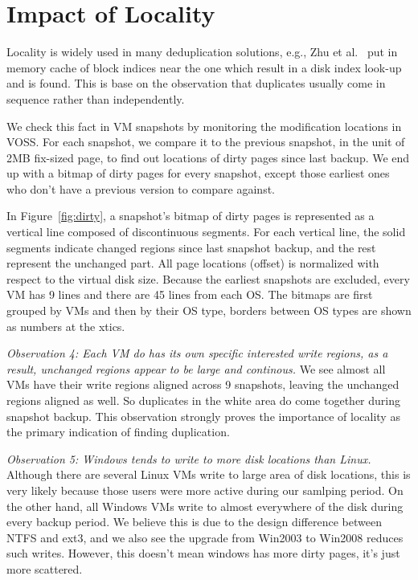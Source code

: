 \section{Impact of Locality}
\label{sect:loc}
Locality is widely used in many deduplication solutions, e.g., Zhu et al.~\cite{bottleneck08}
put in memory cache of block indices near the one which result in a disk index look-up and is found.
This is base on the observation that duplicates usually come in sequence rather than independently.

We check this fact in VM snapshots by monitoring the modification locations in VOSS. 
For each snapshot, we compare it to the previous snapshot, in the unit of 2MB fix-sized page,
to find out locations of dirty pages since last backup. We end up with a bitmap of
dirty pages for every snapshot, except those earliest ones who don't have a previous version
to compare against.

In Figure~\ref{fig:dirty}, a snapshot's bitmap of dirty pages is represented as a vertical line 
composed of discontinuous segments. 
For each vertical line, the solid segments indicate changed regions since last snapshot backup,
and the rest represent the unchanged part.
All page locations (offset) is normalized with respect to the virtual disk size.
Because the earliest snapshots are excluded, 
every VM has 9 lines and there are 45 lines from each OS.
The bitmaps are first grouped by VMs and then by their OS type,
borders between OS types are shown as numbers at the xtics.

\emph{Observation 4: Each VM do has its own specific interested write regions, as a result, 
unchanged regions appear to be large and continous.} We see almost all VMs have
their write regions aligned across 9 snapshots, leaving the unchanged regions aligned as well.
So duplicates in the white area do come together during snapshot backup.
This observation strongly proves the importance of locality as the primary indication of
finding duplication.

\emph{Observation 5: Windows tends to write to more disk locations than Linux.} 
Although there are several Linux VMs write to large area of disk locations, this is very likely
because those users were more active during our samlping period.
On the other hand, all Windows VMs write to almost everywhere of the disk during every backup period.
We believe this is due to the design difference between NTFS and ext3, and we also see
the upgrade from Win2003 to Win2008 reduces such writes. However, this doesn't mean windows has more 
dirty pages, it's just more scattered.

